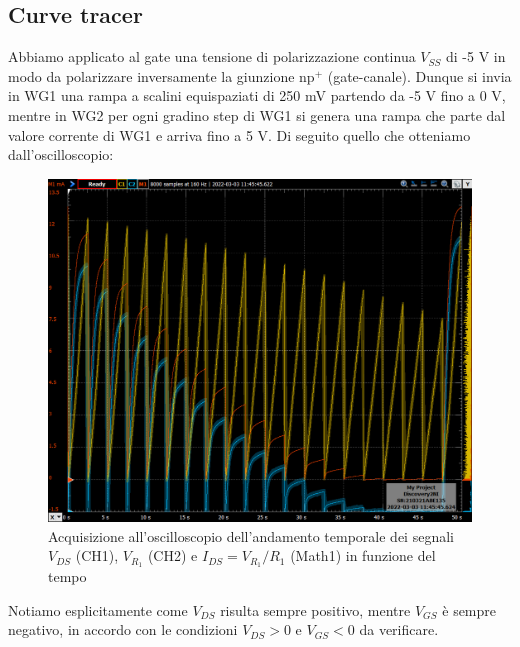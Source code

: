 \documentclass[10pt, a4paper, italian]{article}
\begin{document}
\subsection{Curve tracer}
Abbiamo applicato al gate una tensione di polarizzazione continua
$V_{SS}$ di -5 V in modo da polarizzare inversamente la giunzione
$\text{np}^+$ (gate-canale).
Dunque si invia in WG1 una rampa a scalini equispaziati di 250 mV partendo
da -5 V fino a 0 V, mentre in WG2 per ogni gradino step di WG1 si genera una
rampa che parte dal valore corrente di WG1 e arriva fino a 5 V.
Di seguito quello che otteniamo dall'oscilloscopio:
\begin{figure}[htbp]
    \centering
	\includegraphics[scale=0.4]{time}
    \caption{Acquisizione all'oscilloscopio dell'andamento temporale dei
    segnali $V_{DS}$ (CH1), $V_{R_1}$ (CH2) e $I_{DS} = V_{R_1}/R_1$ (Math1)
    in funzione del tempo}
\end{figure}
Notiamo esplicitamente come $V_{DS}$ risulta sempre positivo, mentre $V_{GS}$
è sempre negativo, in accordo con le condizioni $V_{DS} > 0$ e $V_{GS} < 0$
da verificare.
\end{document}
